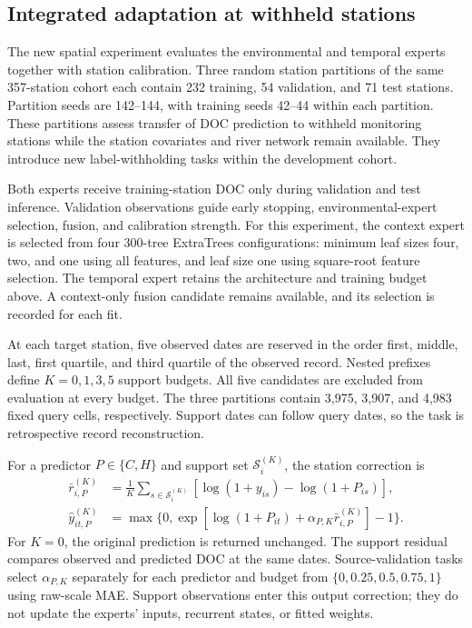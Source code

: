\documentclass[11pt]{article}
\begin{document}
\subsection{Integrated adaptation at withheld stations}
The new spatial experiment evaluates the environmental and temporal experts together with station calibration. Three random station partitions of the same 357-station cohort each contain 232 training, 54 validation, and 71 test stations. Partition seeds are 142--144, with training seeds 42--44 within each partition. These partitions assess transfer of DOC prediction to withheld monitoring stations while the station covariates and river network remain available. They introduce new label-withholding tasks within the development cohort.

Both experts receive training-station DOC only during validation and test inference. Validation observations guide early stopping, environmental-expert selection, fusion, and calibration strength. For this experiment, the context expert is selected from four 300-tree ExtraTrees configurations: minimum leaf sizes four, two, and one using all features, and leaf size one using square-root feature selection. The temporal expert retains the architecture and training budget above. A context-only fusion candidate remains available, and its selection is recorded for each fit.

At each target station, five observed dates are reserved in the order first, middle, last, first quartile, and third quartile of the observed record. Nested prefixes define $K=0,1,3,5$ support budgets. All five candidates are excluded from evaluation at every budget. The three partitions contain 3,975, 3,907, and 4,983 fixed query cells, respectively. Support dates can follow query dates, so the task is retrospective record reconstruction.

For a predictor $P\in\{C,H\}$ and support set $\mathcal S_i^{(K)}$, the station correction is
\begin{align}
 \bar r_{i,P}^{(K)}&=\frac{1}{K}\sum_{s\in\mathcal S_i^{(K)}}
       [\log(1+y_{is})-\log(1+P_{is})],\\
 \widehat y_{it,P}^{(K)}&=\max\{0,\exp[\log(1+P_{it})+
                      \alpha_{P,K}\bar r_{i,P}^{(K)}]-1\}.
 \label{eq:station_adaptation}
\end{align}
For $K=0$, the original prediction is returned unchanged. The support residual compares observed and predicted DOC at the same dates. Source-validation tasks select $\alpha_{P,K}$ separately for each predictor and budget from $\{0,0.25,0.5,0.75,1\}$ using raw-scale MAE. Support observations enter this output correction; they do not update the experts' inputs, recurrent states, or fitted weights.
\end{document}
